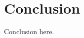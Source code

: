 \documentclass{article} %
\begin{document}
\section{Conclusion}
\label{sec:conclusion}
Conclusion here.




\end{document}
